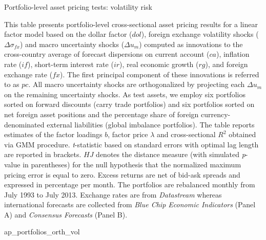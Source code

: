 \begin{landscape}
	
	\begin{table}[ht]
		\caption{Portfolio-level asset pricing tests: volatility risk} \label{tab:ap_portfolios_orth_vol}
		\begin{footnotesize}
			This table presents portfolio-level cross-sectional asset pricing results for a linear factor model based on the dollar factor ($dol$), foreign exchange volatility shocks ($\Delta\sigma_{fx}$) and macro uncertainty shocks ($\Delta u_{m}$) computed as innovations to the cross-country average of forecast dispersions on current account ($ca$), inflation rate ($if$), short-term interest rate ($ir$), real economic growth ($rg$), and foreign exchange rate ($fx$). The first principal component of these innovations is referred to as $pc$. All macro uncertainty shocks are orthogonalized by projecting each $\Delta u_{m}$ on the remaining uncertainty shocks. As test assets, we employ six portfolios sorted on forward discounts (carry trade portfolios) and six portfolios sorted on net foreign asset positions and the percentage share of foreign currency-denominated external liabilities (global imbalance portfolios). The table reports estimates of the factor loadings $b$, factor price $\lambda$ and cross-sectional $R^{2}$ obtained via GMM procedure. \emph{t}-statistic based on \citet{newey_west1987} standard errors with \citet{andrews1991} optimal lag length are reported in brackets. $HJ$ denotes the \citet{hansen/jagannathan:97} distance measure (with simulated \emph{p}-value in parentheses) for the null hypothesis that the normalized maximum pricing error is equal to zero. Excess returns are net of bid-ask spreads and expressed in percentage per month. The portfolios are rebalanced monthly from July 1993 to July 2013. Exchange rates are from \textit{Datastream} whereas international forecasts are collected from \textit{Blue Chip Economic Indicators} (Panel A) and \textit{Consensus Forecasts} (Panel B).
		\end{footnotesize}
		
		{ap_portfolios_orth_vol}
	\end{table}	
	
\end{landscape}